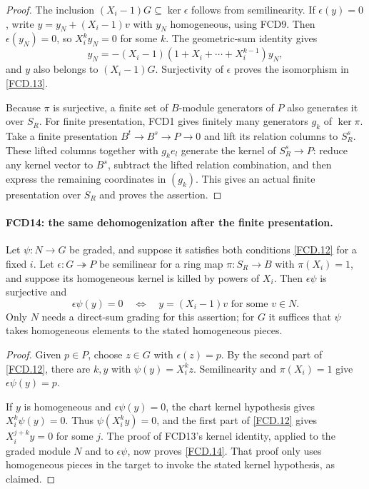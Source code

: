 \begin{proof}
The inclusion $(X_i-1)G\subseteq\ker\epsilon$ follows from
semilinearity.  If $\epsilon(y)=0$, write
$y=y_N+(X_i-1)v$ with $y_N$ homogeneous, using FCD9.
Then $\epsilon(y_N)=0$, so $X_i^ky_N=0$ for some $k$.
The geometric-sum identity gives
\[
 y_N=-(X_i-1)(1+X_i+\cdots+X_i^{k-1})y_N,
\]
and $y$ also belongs to $(X_i-1)G$.  Surjectivity of
$\epsilon$ proves the isomorphism in \eqref{FCD.13}.

Because $\pi$ is surjective, a finite set of $B$-module generators
of $P$ also generates it over $S_R$.  For finite presentation,
FCD1 gives finitely many generators $g_k$ of $\ker\pi$.
Take a finite presentation $B^t\to B^s\to P\to0$ and lift its
relation columns to $S_R^s$.  These lifted columns together with
$g_ke_l$ generate the kernel of $S_R^s\to P$: reduce any
kernel vector to $B^s$, subtract the lifted relation combination,
and then express the remaining coordinates in $(g_k)$.
This gives an actual finite presentation over $S_R$ and proves
the assertion.
\end{proof}

\paragraph{FCD14: the same dehomogenization after the finite presentation.}
\label{claim:FCD14}
Let $\psi:N\to G$ be graded, and suppose it satisfies both
conditions \eqref{FCD.12} for a fixed $i$.  Let
$\epsilon:G\twoheadrightarrow P$ be semilinear for a ring map
$\pi:S_R\to B$ with $\pi(X_i)=1$, and suppose its homogeneous
kernel is killed by powers of $X_i$.  Then $\epsilon\psi$ is
surjective and
\[
 \epsilon\psi(y)=0\quad\Longleftrightarrow\quad
 y=(X_i-1)v\text{ for some }v\in N.                 \tag{FCD.14}\label{FCD.14}
\]
Only $N$ needs a direct-sum grading for this assertion; for $G$
it suffices that $\psi$ takes homogeneous elements to the stated
homogeneous pieces.

\begin{proof}
Given $p\in P$, choose $z\in G$ with $\epsilon(z)=p$.
By the second part of \eqref{FCD.12}, there are $k,y$ with
$\psi(y)=X_i^kz$.  Semilinearity and $\pi(X_i)=1$ give
$\epsilon\psi(y)=p$.

If $y$ is homogeneous and $\epsilon\psi(y)=0$, the chart
kernel hypothesis gives $X_i^k\psi(y)=0$.
Thus $\psi(X_i^ky)=0$, and the first part of
\eqref{FCD.12} gives $X_i^{j+k}y=0$ for some $j$.
The proof of FCD13's kernel identity, applied to the graded
module $N$ and to $\epsilon\psi$, now proves
\eqref{FCD.14}.  That proof only uses homogeneous pieces in
the target to invoke the stated kernel hypothesis, as claimed.
\end{proof}

